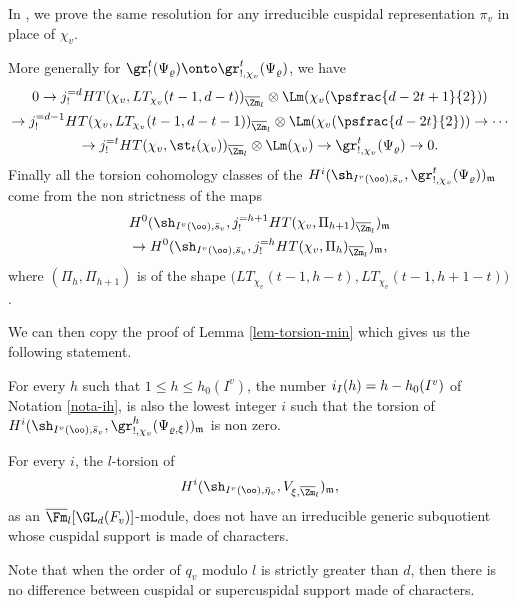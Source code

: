 \begin{remark}
In \cite{boyer-duke}, we prove the same resolution for any irreducible
cuspidal representation $\pi_v$ in place of $\chi_v$.
\end{remark}

More generally for $\gr^t_!(\Psi_\varrho) \onto
\gr^t_{!,\chi_v}(\Psi_\varrho)$, we have
\begin{multline} \label{eq-resolution-psi}
0 \to j^{=d}_! HT(\chi_{v},LT_{\chi_v}(t-1,d-t))_{\overline \Zm_l} \otimes \Lm(\chi_{v}(\psfrac{d-2t+1}{2}))\\
\to j^{=d-1}_!HT(\chi_{v},LT_{\chi_{v}}(t-1,d-t-1))_{\overline \Zm_l} \otimes \Lm(\chi_{v}(\psfrac{d-2t}{2}))
\to \cdots \\ \to j^{=t}_! HT(\chi_{v},\st_t(\chi_{v}))_{\overline \Zm_l} \otimes \Lm(\chi_{v})
\to \gr^t_{!,\chi_{v}}(\Psi_\varrho) \to 0.
\end{multline}
Finally all the torsion cohomology classes of the
$H^i(\sh_{I^v(\oo),\bar s_v},\gr^t_{!,\chi_v}(\Psi_\varrho))_{\mathfrak m}$
come from the non strictness of the maps
\begin{multline} \label{eq-map-hmax}
H^{0}(\sh_{I^v(\oo),\bar s_v},j^{=h+1}_! HT(\chi_v,\Pi_{h+1})_{\overline \Zm_l})_{\mathfrak m}\\
\to H^0(\sh_{I^v(\oo),\bar s_v},j^{=h}_! HT(\chi_v,\Pi_h)_{\overline \Zm_l})_{\mathfrak m},
\end{multline}
where $(\Pi_h,\Pi_{h+1})$ is of the shape $\bigl (LT_{\chi_v}(t-1,h-t),LT_{\chi_v}(t-1,h+1-t) \bigr)$.

We can then copy the proof of Lemma \ref{lem-torsion-min} which gives us the following
statement.

\begin{lemma}
For every $h$ such that $1 \leq h \leq h_0(I^v)$, the number
$i_I(h)=h-\nobreak h_0(I^v)$ of Notation \ref{nota-ih}, is also the lowest integer $i$ such that the torsion
of $H^i(\sh_{I^{v}(\oo),\bar s_v},\gr^h_{!,\chi_{v}}(\Psi_{\varrho,\xi}))_{\mathfrak m}$ is non zero.
\end{lemma}

\begin{lemma} \label{lem-generic-sq}
For every $i$, the $l$-torsion of
\[
H^i(\sh_{I^v(\oo),\bar \eta_v},V_{\xi,\overline \Zm_l})_{\mathfrak m},
\]
as an $\overline \Fm_l[\GL_d(F_v)]$-module,
does not have an irreducible generic subquotient
whose cuspidal support is made of characters.
\end{lemma}

\begin{remark}
Note that when the order of $q_v$ modulo $l$ is strictly greater than $d$, then
there is no difference between cuspidal or supercuspidal support made of characters.
\end{remark}

